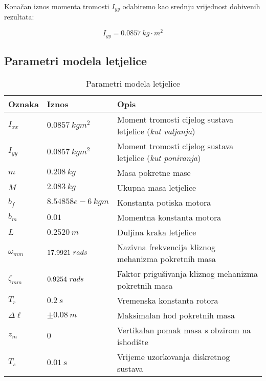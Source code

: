\documentclass[11pt,a4paper]{article}
\begin{document}
Konačan iznos momenta tromosti $I_{yy}$ odabiremo kao srednju vrijednost dobivenih rezultata:

\begin{equation}
\boxed{
I_{yy} = 0.0857 \ kg \cdot m^{2}
}
\label{eq:Iyy}
\end{equation}


\newpage

\subsection{Parametri modela letjelice}




\setlength\extrarowheight{1pt}
\begin{table}[h]
\centering
\caption{Parametri modela letjelice}
\label{params}
\begin{tabular}{lll}
\hline
\textbf{Oznaka} &  \textbf{Iznos}  &  \textbf{Opis}   \\ \hline 
$I_{xx}$ & $0.0857 \ kgm^{2}$ & Moment tromosti cijelog sustava letjelice (\textit{kut valjanja})   \\ 
$I_{yy}$ & $0.0857 \ kg m^{2}$ &  Moment tromosti cijelog sustava letjelice (\textit{kut poniranja})\\ 
$m$ & $0.208 \ kg$ &  Masa pokretne mase    \\ 
$M$ & $2.083 \ kg$ & Ukupna masa letjelice      \\ 
$b_{f}$ & $8.54858e-6 \ kgm$& Konstanta potiska motora     \\ 
$b_{m}$ & $0.01$& Momentna konstanta motora     \\ 
$ L$ & $0.2520 \ m $ &  Duljina kraka letjelice    \\ 
$\omega_{mm} $ & $ 17.9921 \ rad\/s$ & Nazivna frekvencija kliznog mehanizma pokretnih masa     \\
$\zeta_{mm} $ & $ 0.9254 \ rad\/s$ & Faktor prigušivanja kliznog mehanizma pokretnih masa      \\  
$T_{r} $ & $ 0.2 \ s$ &  Vremenska konstanta rotora    \\
$\Delta \ell $ & $\pm0.08 \ m $ &  Maksimalan hod pokretnih masa    \\  
$z_{m} $ & $ 0$ & Vertikalan pomak masa s obzirom na ishodište     \\ 
$T_{s} $ & $ 0.01 \ s$ &  Vrijeme uzorkovanja diskretnog sustava    \\ \hline
\end{tabular}
\end{table}
\end{document}
